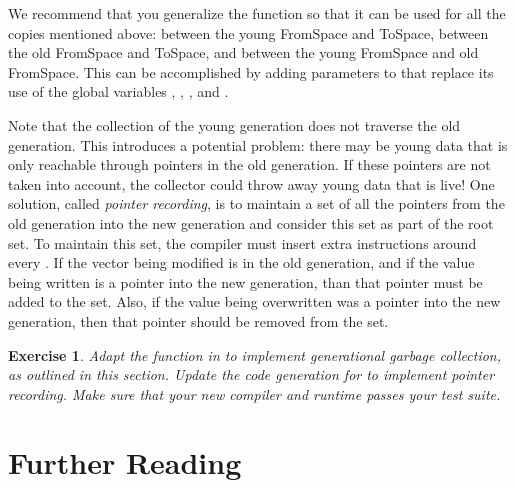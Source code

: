\documentclass[7x10,nocrop]{TimesAPriori_MIT}%
\newtheorem{exercise}[theorem]{Exercise}
\begin{document}
{We recommend that you generalize the  function so that it
can be used for all the copies mentioned above: between the young
FromSpace and ToSpace, between the old FromSpace and ToSpace, and
between the young FromSpace and old FromSpace. This can be
accomplished by adding parameters to  that replace its
use of the global variables ,
, , and .

Note that the collection of the young generation does not traverse the
old generation. This introduces a potential problem: there may be
young data that is only reachable through pointers in the old
generation. If these pointers are not taken into account, the
collector could throw away young data that is live!  One solution,
called \emph{pointer recording}, is to maintain a set of all the
pointers from the old generation into the new generation and consider
this set as part of the root set.  To maintain this set, the compiler
must insert extra instructions around every . If the
vector being modified is in the old generation, and if the value being
written is a pointer into the new generation, than that pointer must
be added to the set. Also, if the value being overwritten was a
pointer into the new generation, then that pointer should be removed
from the set.

\begin{exercise}\normalfont
  Adapt the  function in  to implement
  generational garbage collection, as outlined in this section.
  Update the code generation for  to implement
  pointer recording. Make sure that your new compiler and runtime
  passes your test suite.
\end{exercise}

\fi}

\section{Further Reading}
\end{document}

